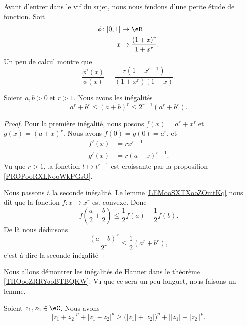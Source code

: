 Avant d'entrer dans le vif du sujet, nous nous fendons d'une petite étude de fonction. Soit
\begin{equation}
    \begin{aligned}
        \phi\colon \mathopen[ 0 , 1 \mathclose]&\to \eR \\
        x&\mapsto \frac{ (1+x)^r }{ 1+x^r }. 
    \end{aligned}
\end{equation}
Un peu de calcul montre que
\begin{equation}
    \frac{ \phi'(x) }{ \phi(x) }=\frac{ r(1-x^{r-1}) }{ (1+x^r)(1+x) }.
\end{equation}

\begin{lemma}       \label{LEMooFKKEooDTypUd}
    Soient \( a,b>0\) et \( r>1\). Nous avons les inégalités
    \begin{equation}
        a^r+b^r\leq (a+b)^r\leq 2^{r-1}(a^r+b^r).
    \end{equation}
\end{lemma}

\begin{proof}
    Pour la première inégalité, nous posons \( f(x)=a^r+x^r\) et \( g(x)=(a+x)^r\). Nous avons \( f(0)=g(0)=a^r\), et
    \begin{subequations}
        \begin{align}
            f'(x)&=rx^{r-1}\\
            g'(x)&=r(a+x)^{r-1}.
        \end{align}
    \end{subequations}
    Vu que \( r>1\), la fonction \( t\mapsto t^{r-1}\) est croissante par la proposition \ref{PROPooRXLNooWkPGsO}.

    Nous passons à la seconde inégalité. Le lemme \ref{LEMooSXTXooZOmtKq} nous dit que la fonction \( f\colon x\mapsto x^r \) est convexe. Donc
    \begin{equation}
        f\left( \frac{ a }{2}+\frac{ b }{2} \right)\leq\frac{ 1 }{2}f(a)+\frac{ 1 }{2}f(b).
    \end{equation}
    De là nous déduisons
    \begin{equation}
        \frac{ (a+b)^r }{ 2^r }\leq \frac{ 1 }{2}(a^r+b^r),
    \end{equation}
    c'est à dire la seconde inégalité.
\end{proof}

Nous allons démontrer les inégalités de Hanner dans le théorème \ref{THOooZRRYooBTBQKW}. Vu que ce sera un peu longuet, nous faisons un lemme.
\begin{lemma}       \label{LEMooDHRCooQiSpyC}
    Soient \( z_1,z_2\in \eC\). Nous avons
    \begin{equation}        \label{EQooMUXVooSpGSyG}
        | z_1+z_2 |^p+| z_1-z_2 |^p\geq \big( | z_1 |+| z_2 | \big)^p+\big| | z_1 |-| z_2 | \big|^p.
    \end{equation}
\end{lemma}

